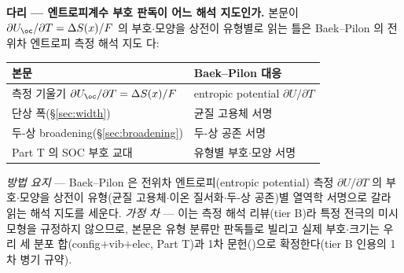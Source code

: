 
\begin{srcbox}
\textbf{다리 --- 엔트로피계수 부호 판독이 어느 해석 지도인가.} 본문이 $\partial U_\oc/\partial T=\Delta
S(x)/F$ 의 부호$\cdot$모양을 상전이 유형별로 읽는 틀은 Baek--Pilon 의 전위차 엔트로피 측정 해석
지도\cite{baek_pilon2022} 다:
\begin{center}\footnotesize
\begin{tabular}{@{}ll@{}}
\hline
본문 & Baek--Pilon\cite{baek_pilon2022} 대응 \\
\hline
측정 기울기 $\partial U_\oc/\partial T=\Delta S(x)/F$ & entropic potential $\partial U/\partial T$ \\
단상 폭(\S\ref{sec:width}) & 균질 고용체 서명 \\
두-상 broadening(\S\ref{sec:broadening}) & 두-상 공존 서명 \\
Part T 의 SOC 부호 교대 & 유형별 부호$\cdot$모양 서명 \\
\hline
\end{tabular}
\end{center}
\emph{방법 요지} --- Baek--Pilon 은 전위차 엔트로피(entropic potential) 측정 $\partial U/\partial T$ 의
부호$\cdot$모양을 상전이 유형(균질 고용체$\cdot$이온 질서화$\cdot$두-상 공존)별 열역학 서명으로 갈라 읽는 해석
지도를 세운다. \emph{가정 차} --- 이는 측정 해석 리뷰(tier B)라 특정 전극의 미시 모형을 규정하지 않으므로,
본문은 유형 분류만 판독틀로 빌리고 실제 부호$\cdot$크기는 우리 세 분포 합(config$+$vib$+$elec, Part T)과 1차
문헌(\cite{reynier2003,allart2018})으로 확정한다(tier B 인용의 1차 병기 규약).
\end{srcbox}
